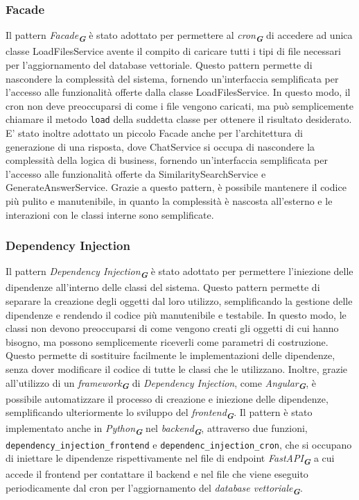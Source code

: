 \subsubsection{Facade}
\label{sec:facade}

Il pattern \emph{Facade}\textsubscript{\textbf{\textit{G}}} è stato adottato per permettere al \emph{cron}\textsubscript{\textbf{\textit{G}}} di accedere ad unica classe LoadFilesService avente il compito di caricare tutti i tipi di file necessari per l'aggiornamento del database vettoriale. Questo pattern permette di nascondere la complessità del sistema, fornendo un'interfaccia semplificata per l'accesso alle funzionalità offerte dalla classe LoadFilesService. In questo modo, il cron non deve preoccuparsi di come i file vengono caricati, ma può semplicemente chiamare il metodo \texttt{load} della suddetta classe per ottenere il risultato desiderato.
E' stato inoltre adottato un piccolo Facade anche per l'architettura di generazione di una risposta, dove ChatService si occupa di nascondere la complessità della logica di business, fornendo un'interfaccia semplificata per l'accesso alle funzionalità offerte da SimilaritySearchService e GenerateAnswerService.
Grazie a questo pattern, è possibile mantenere il codice più pulito e manutenibile, in quanto la complessità è nascosta all'esterno e le interazioni con le classi interne sono semplificate.


\subsubsection{Dependency Injection}
\label{sec:dependency_injection}

Il pattern \emph{Dependency Injection}\textsubscript{\textbf{\textit{G}}} è stato adottato per permettere l'iniezione delle dipendenze all'interno delle classi del sistema. Questo pattern permette di separare la creazione degli oggetti dal loro utilizzo, semplificando la gestione delle dipendenze e rendendo il codice più manutenibile e testabile. In questo modo, le classi non devono preoccuparsi di come vengono creati gli oggetti di cui hanno bisogno, ma possono semplicemente riceverli come parametri di costruzione. Questo permette di sostituire facilmente le implementazioni delle dipendenze, senza dover modificare il codice di tutte le classi che le utilizzano. Inoltre, grazie all'utilizzo di un \emph{framework}\textsubscript{\textbf{\textit{G}}} di \emph{Dependency Injection}, come \emph{Angular}\textsubscript{\textbf{\textit{G}}}, è possibile automatizzare il processo di creazione e iniezione delle dipendenze, semplificando ulteriormente lo sviluppo del \emph{frontend}\textsubscript{\textbf{\textit{G}}}. Il pattern è stato implementato anche in \emph{Python}\textsubscript{\textbf{\textit{G}}} nel \emph{backend}\textsubscript{\textbf{\textit{G}}}, attraverso due funzioni, \texttt{dependency\_injection\_frontend} e \texttt{dependenc\_injection\_cron}, che si occupano di iniettare le dipendenze rispettivamente nel file di endpoint \emph{FastAPI}\textsubscript{\textbf{\textit{G}}} a cui accede il frontend per contattare il backend e nel file che viene eseguito periodicamente dal cron per l'aggiornamento del \emph{database vettoriale}\textsubscript{\textbf{\textit{G}}}.



